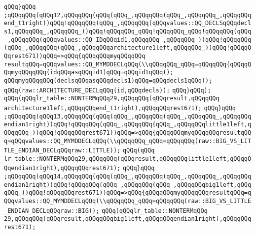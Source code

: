 \verb|qQQq}qQQq|\newline
\verb|;qQQqqQQq(qQQq12,qQQqqQQq(qQQq(qQQq_,qQQqqQQq(qQQq_,qQQqqQQq_,qQQqqQQqend_t1right))qQQq!qQQqqQQq(qQQq_,qQQqqQQq(qQQqvalues::QQ_DECLSqQQqdecls1,qQQqqQQq_,qQQqqQQq_))qQQq!qQQqqQQq_qQQq!qQQqqQQq_qQQq!qQQqqQQq(qQQq_,qQQqqQQq(qQQqvalues::QQ_IDqQQqid1,qQQqqQQq_,qQQqqQQq_))qQQq!qQQqqQQq(qQQq_,qQQqqQQq(qQQq_,qQQqqQQqarchitecture1left,qQQqqQQq_))qQQq!qQQqqQQqrest671))qQQq=>qQQq{qQQqqQQqmyqQQqqQQq|\newline
\verb|resultqQQq=qQQqvalues::QQ_MYMDDECLqQQq(\\qQQqqQQq_qQQq=qQQqqQQq{qQQqqQQqmyqQQqqQQq(idqQQqasqQQqid1)qQQq=qQQqid1qQQq();|\newline
\verb|qQQqmyqQQqqQQq(declsqQQqasqQQqdecls1)qQQq=qQQqdecls1qQQq();|\newline
\verb|qQQq(raw::ARCHITECTURE_DECLqQQq(id,qQQqdecls));|\newline
\verb|qQQq}qQQq);|\newline
\verb|qQQq(qQQqlr_table::NONTERMqQQq29,qQQqqQQq(qQQqresult,qQQqqQQq|\newline
\verb|architecture1left,qQQqqQQqend_t1right),qQQqqQQqrest671);|\newline
\verb|qQQq}qQQq|\newline
\verb|;qQQqqQQq(qQQq13,qQQqqQQq(qQQq(qQQq_,qQQqqQQq(qQQq_,qQQqqQQq_,qQQqqQQqendian1right))qQQq!qQQqqQQq(qQQq_,qQQqqQQq(qQQq_,qQQqqQQqlittle1left,qQQqqQQq_))qQQq!qQQqqQQqrest671))qQQq=>qQQq{qQQqqQQqmyqQQqqQQqresultqQQq=qQQqvalues::QQ_MYMDDECLqQQq(\\qQQqqQQq_qQQq=qQQqqQQq(raw::BIG_VS_LITTLE_ENDIAN_DECLqQQqraw::LITTLE));|\newline
\verb|qQQq(qQQq|\newline
\verb|lr_table::NONTERMqQQq29,qQQqqQQq(qQQqresult,qQQqqQQqlittle1left,qQQqqQQqendian1right),qQQqqQQqrest671);|\newline
\verb|qQQq}qQQq|\newline
\verb|;qQQqqQQq(qQQq14,qQQqqQQq(qQQq(qQQq_,qQQqqQQq(qQQq_,qQQqqQQq_,qQQqqQQqendian1right))qQQq!qQQqqQQq(qQQq_,qQQqqQQq(qQQq_,qQQqqQQqbig1left,qQQqqQQq_))qQQq!qQQqqQQqrest671))qQQq=>qQQq{qQQqqQQqmyqQQqqQQqresultqQQq=qQQqvalues::QQ_MYMDDECLqQQq(\\qQQqqQQq_qQQq=qQQqqQQq(raw::BIG_VS_LITTLE_ENDIAN_DECLqQQqraw::BIG));|\newline
\verb|qQQq(qQQqlr_table::NONTERMqQQq|\newline
\verb|29,qQQqqQQq(qQQqresult,qQQqqQQqbig1left,qQQqqQQqendian1right),qQQqqQQqrest671);|\newline
